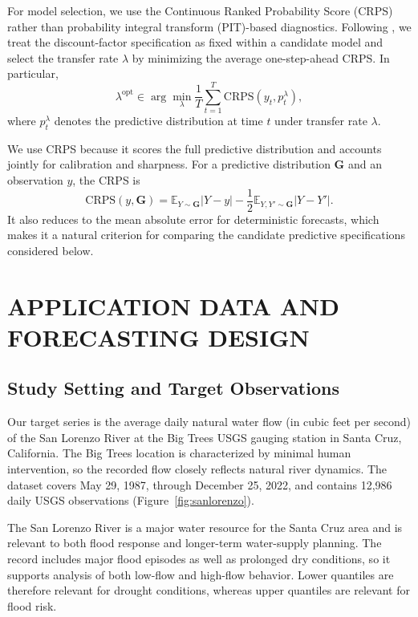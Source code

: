 \documentclass[APA,STIX1COL]{WileyNJD-v2}
\begin{document}
For model selection, we use the Continuous Ranked Probability Score (CRPS) rather than probability integral transform (PIT)-based diagnostics. Following \citet{barata2021_flex_quantile}, we treat the discount-factor specification as fixed within a candidate model and select the transfer rate \(\lambda\) by minimizing the average one-step-ahead CRPS. In particular,
\[
\lambda^{\text{opt}} \in \arg\min_{\lambda} \frac{1}{T}\sum_{t=1}^T \text{CRPS}(y_t,p_t^{\lambda}),
\]
where \(p_t^{\lambda}\) denotes the predictive distribution at time \(t\) under transfer rate \(\lambda\).

We use CRPS because it scores the full predictive distribution and accounts jointly for calibration and sharpness. For a predictive distribution \(\mathbf{G}\) and an observation \(y\), the CRPS is
\[
\text{CRPS}(y, \mathbf{G}) = \mathbb{E}_{Y \sim \mathbf{G}}|Y - y| - \frac{1}{2}\mathbb{E}_{Y,Y'\sim \mathbf{G}}|Y - Y'|.
\]
It also reduces to the mean absolute error for deterministic forecasts, which makes it a natural criterion for comparing the candidate predictive specifications considered below.

\section{APPLICATION DATA AND FORECASTING DESIGN}
\label{sec:data}

\subsection{Study Setting and Target Observations}

Our target series is the average daily natural water flow (in cubic feet per second) of the San Lorenzo River at the Big Trees USGS gauging station in Santa Cruz, California. The Big Trees location is characterized by minimal human intervention, so the recorded flow closely reflects natural river dynamics. The dataset covers May 29, 1987, through December 25, 2022, and contains 12,986 daily USGS observations (Figure~\ref{fig:sanlorenzo}).

The San Lorenzo River is a major water resource for the Santa Cruz area and is relevant to both flood response and longer-term water-supply planning. The record includes major flood episodes as well as prolonged dry conditions, so it supports analysis of both low-flow and high-flow behavior. Lower quantiles are therefore relevant for drought conditions, whereas upper quantiles are relevant for flood risk.
\end{document}
